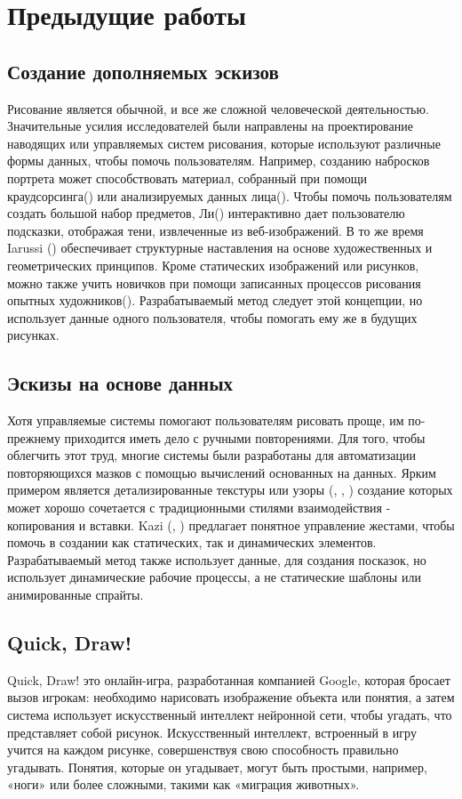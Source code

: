 \section{Предыдущие работы }
\subsection{Создание дополняемых эскизов}
Рисование является обычной, и все же сложной человеческой деятельностью. Значительные усилия исследователей были направлены на проектирование наводящих или управляемых систем рисования, которые используют различные формы данных, чтобы помочь пользователям. Например, созданию набросков портрета может способствовать материал, собранный при помощи краудсорсинга(\cite{bib28}) или анализируемых данных лица(\cite{bib29}). Чтобы помочь пользователям создать большой набор предметов, Ли(\cite{bib17}) интерактивно дает пользователю подсказки, отображая тени, извлеченные из веб-изображений. В то же время Iarussi (\cite{bib30}) обеспечивает структурные наставления на основе художественных и геометрических принципов. Кроме статических изображений или рисунков, можно также учить новичков при помощи записанных процессов рисования опытных художников(\cite{bib18}).
Разрабатываемый метод следует этой концепции, но использует данные одного пользователя, чтобы помогать ему же в будущих рисунках.
\subsection{Эскизы на основе данных}
Хотя управляемые системы помогают пользователям рисовать проще, им по-прежнему приходится иметь дело с ручными повторениями. Для того, чтобы облегчить этот труд, многие системы были разработаны для автоматизации повторяющихся мазков с помощью вычислений основанных на данных. Ярким примером является детализированные текстуры или узоры (\cite{bib3}, \cite{bib31}, \cite{bib32}) создание которых может хорошо сочетается с традиционными стилями взаимодействия - копирования и вставки. Kazi (\cite{bib2}, \cite{bib11}) предлагает понятное управление жестами, чтобы помочь в создании как статических, так и динамических элементов.
Разрабатываемый метод также использует данные, для создания посказок, но использует динамические рабочие процессы, а не статические шаблоны или анимированные спрайты. 

\subsection{Quick, Draw!}
Quick, Draw! это онлайн-игра, разработанная компанией Google, которая бросает вызов игрокам: необходимо нарисовать изображение объекта или понятия, а затем система использует искусственный интеллект нейронной сети, чтобы угадать, что представляет собой рисунок. Искусственный интеллект, встроенный в игру учится на каждом рисунке, совершенствуя свою способность правильно угадывать. Понятия, которые он угадывает, могут быть простыми, например, «ноги» или более сложными, такими как «миграция животных».

